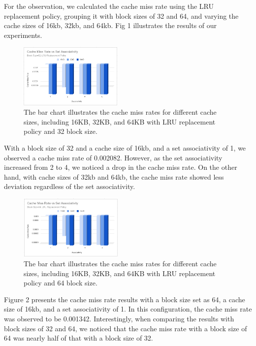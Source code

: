 \documentclass[conference]{IEEEtran}
\begin{document}
For the observation, we calculated the cache miss rate using the LRU replacement policy, grouping it with block sizes of 32 and 64, and varying the cache sizes of 16kb, 32kb, and 64kb. Fig 1 illustrates the results of our experiments.

\begin{figure}[H]
    \centering
    \includegraphics[width=0.45\textwidth]{sha/sha_cache_vs_setAssocBL32.png}
    \caption{The bar chart illustrates the cache miss rates for different cache sizes, including 16KB, 32KB, and 64KB with LRU replacement policy and 32 block size.}
\end{figure}

With a block size of 32 and a cache size of 16kb, and a set associativity of 1, we observed a cache miss rate of 0.002082. However, as the set associativity increased from 2 to 4, we noticed a drop in the cache miss rate. On the other hand, with cache sizes of 32kb and 64kb, the cache miss rate showed less deviation regardless of the set associativity.

\begin{figure}[H]
    \centering
    \includegraphics[width=0.45\textwidth]{sha/sha_cache_vs_setAssocBL64.png}
    \caption{The bar chart illustrates the cache miss rates for different cache sizes, including 16KB, 32KB, and 64KB with LRU replacement policy and 64 block size.}
\end{figure}

Figure 2 presents the cache miss rate results with a block size set as 64, a cache size of 16kb, and a set associativity of 1. In this configuration, the cache miss rate was observed to be 0.001342. Interestingly, when comparing the results with block sizes of 32 and 64, we noticed that the cache miss rate with a block size of 64 was nearly half of that with a block size of 32.
\end{document}

